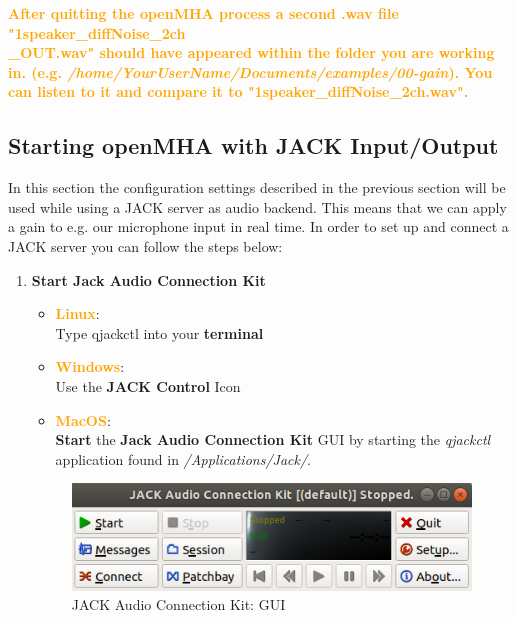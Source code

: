 \documentclass[11pt,a4paper,twoside]{article}
\newcommand{\+}{\discretionary{\mbox{\scriptsize$\hookleftarrow$}}{}{}}
\begin{document}
{{{\textcolor{orange}{\textbf{After quitting the openMHA process a second .wav file "1speaker\_diffNoise\_2ch \\ \_OUT.wav" should have appeared within the folder you are working in. (e.g. \textit{/home/YourUserName/Documents/examples/00-gain}). You can listen to it and compare it to "1speaker\_diffNoise\_2ch.wav".}}

\newpage

\subsection{Starting openMHA with JACK Input/Output}

In this section the configuration settings described in the previous section will be used while using a JACK server as audio backend. This means that we can apply a gain to e.g. our microphone input in real time. In order to set up and connect a JACK server you can follow the steps below:

\begin{enumerate}
    \item \textbf{Start Jack Audio Connection Kit} 
    
    \begin{itemize}
\item \textcolor{orange}{\textbf{Linux}}: \\ Type {\ttfamily qjackctl} into your \textbf{terminal} 
\item \textcolor{orange}{\textbf{Windows}}: \\ Use the \textbf{JACK Control} Icon
\item \textcolor{orange}{\textbf{MacOS}}: \\ \textbf{Start} the \textbf{Jack Audio Connection Kit} GUI by starting the \textit{qjackctl} application found in \textit{/Applications/Jack/}.
\end{itemize}

\begin{figure}[H]
\centering
\includegraphics[scale=0.4]{jack_gui.png}
\caption{JACK Audio Connection Kit: GUI}
\end{figure}
      

\end{enumerate}}}}
\end{document}
